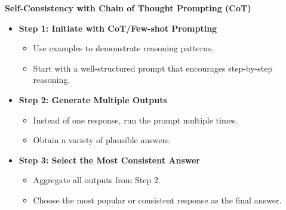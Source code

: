 \documentclass[aspectratio=169, xcolor={dvipsnames}, 10pt, brazil]{beamer}
\begin{document}
\begin{frame}{\textbf{Self-Consistency with Chain of Thought Prompting (CoT)}}
    
    \vspace{-1em}
    \begin{itemize}
        \item \textbf{\textcolor{myblue}{Step 1: Initiate with CoT/Few-shot Prompting}}  
        \begin{itemize}
            \item Use examples to demonstrate reasoning patterns.
            \item Start with a well-structured prompt that encourages step-by-step reasoning.
        \end{itemize}
        \vspace{0.5em}
        
        \item \textbf{\textcolor{mygreen}{Step 2: Generate Multiple Outputs}}
        \begin{itemize}
            \item Instead of one response, run the prompt multiple times.
            \item Obtain a variety of plausible answers.
        \end{itemize}
        \vspace{0.5em}
        
        \item \textbf{\textcolor{myorange}{Step 3: Select the Most Consistent Answer}}
        \begin{itemize}
            \item Aggregate all outputs from Step 2.
            \item Choose the most popular or consistent response as the final answer.
        \end{itemize}
    \end{itemize}
    
  

\end{frame}
\end{document}
